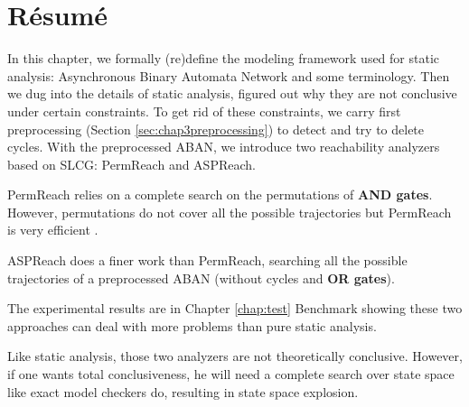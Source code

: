 \section{R\'esum\'e}
In this chapter, we formally (re)define the modeling framework used for static analysis: Asynchronous Binary Automata Network and some terminology.
Then we dug into the details of static analysis, figured out why they are not conclusive under certain constraints.
To get rid of these constraints, we carry first preprocessing (Section \ref{sec:chap3preprocessing}) to detect and try to delete cycles.
With the preprocessed ABAN, we introduce two reachability analyzers based on SLCG: PermReach and ASPReach.

PermReach relies on a complete search on the permutations of \textbf{AND gates}.
However, permutations do not cover all the possible trajectories but PermReach is very efficient .

ASPReach does a finer work than PermReach, searching all the possible trajectories of a preprocessed ABAN (without cycles and \textbf{OR gates}).

The experimental results are in Chapter \ref{chap:test} Benchmark showing these two approaches can deal with more problems than pure static analysis.

Like static analysis, those two analyzers are not theoretically conclusive.
However, if one wants total conclusiveness, he will need a complete search over state space like exact model checkers do, resulting in state space explosion.